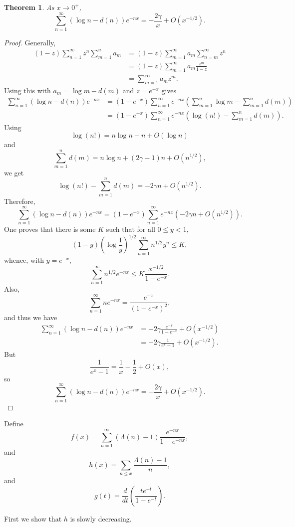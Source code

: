 \documentclass{article}
\newtheorem{theorem}{Theorem}
\begin{document}
\begin{theorem}
As $x \to 0^+$,
\[
\sum_{n=1}^\infty (\log n  - d(n)) e^{-nx}=
 -\frac{2\gamma}{x} + O(x^{-1/2}).
\]
\label{logd}
\end{theorem}
\begin{proof}
Generally,
\begin{align*}
(1-z)\sum_{n=1}^\infty z^n \sum_{m=1}^n a_m&=
(1-z)\sum_{m=1}^\infty a_m \sum_{n=m}^\infty z^n\\
&=(1-z) \sum_{m=1}^\infty a_m \frac{z^m}{1-z}\\
&=\sum_{m=1}^\infty a_m z^m.
\end{align*}
Using this with $a_m = \log m-d(m)$ and $z=e^{-x}$ gives
\begin{align*}
\sum_{n=1}^\infty (\log n-d(n)) e^{-nx}&=
(1-e^{-x})\sum_{n=1}^\infty e^{-nx}\left( \sum_{m=1}^n \log m-\sum_{m=1}^n d(m) \right)\\
&=(1-e^{-x})\sum_{n=1}^\infty e^{-nx} \left( \log (n!) - \sum_{m=1}^n d(m) \right).
\end{align*}
Using
\[
\log(n!)  = n\log n -n + O(\log n)
\]
and
\[
\sum_{m=1}^n d(m) = n\log n + (2\gamma-1)n +O(n^{1/2}),
\]
we get
\[
\log(n!) - \sum_{m=1}^n d(m) = -2\gamma n + O(n^{1/2}).
\]
Therefore,
\[
\sum_{n=1}^\infty (\log n-d(n)) e^{-nx} =(1-e^{-x}) \sum_{n=1}^\infty e^{-nx}( -2\gamma n + O(n^{1/2})).
\]
One proves that there is some $K$ such that for all $0 \leq y < 1$,
\[
(1-y) \left( \log \frac{1}{y} \right)^{1/2} \sum_{n=1}^\infty n^{1/2} y^n \leq K,
\]
whence, with $y=e^{-x}$,
\[
\sum_{n=1}^\infty n^{1/2} e^{-nx} \leq K \frac{x^{-1/2}}{1-e^{-x}}.
\]
Also,
\[
\sum_{n=1}^\infty ne^{-nx} = \frac{e^{-x}}{(1-e^{-x})^2},
\]
and thus we have
\begin{align*}
\sum_{n=1}^\infty (\log n-d(n)) e^{-nx} &=-2\gamma \frac{e^{-x}}{1-e^{-x}}
+O(x^{-1/2})\\
&=-2\gamma \frac{1}{e^x-1} +O(x^{-1/2}).
\end{align*}
But
\[
\frac{1}{e^x-1}  = \frac{1}{x}-\frac{1}{2}+O(x),
\]
so 
\[
\sum_{n=1}^\infty (\log n-d(n)) e^{-nx} = -\frac{2\gamma}{x} + O(x^{-1/2}).
\]
\end{proof}



Define
\[
f(x) = \sum_{n=1}^\infty (\Lambda(n)-1) \frac{e^{-nx}}{1-e^{-nx}},
\]
and
\[
h(x) = \sum_{n \leq x} \frac{\Lambda(n)-1}{n},
\]
and
\[
g(t) = \frac{d}{dt} \left( \frac{te^{-t}}{1-e^{-t}} \right).
\]

First we show that $h$ is slowly decreasing.
\end{document}
